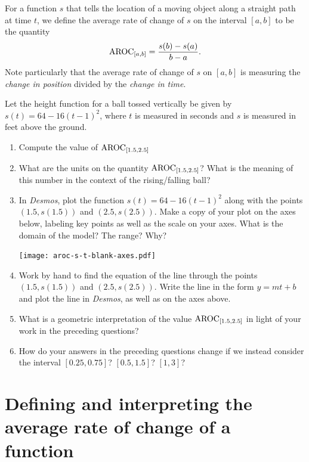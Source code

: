 \documentclass[nooutcomes]{ximera}
\begin{document}
For a function $s$ that tells the location of a moving object along a straight path at time $t$, we define the average rate of change of $s$ on the interval $[a,b]$ to be the quantity%
\begin{equation*}
\mathrm{AROC}_{[a,b]} = \frac{s(b)-s(a)}{b-a}\text{.}
\end{equation*}
 Note particularly that the average rate of change of $s$ on $[a,b]$ is measuring the \emph{change in position} divided by the \emph{change in time}.%

\begin{exploration}
Let the height function for a ball tossed vertically be given by $s(t) = 64 - 16(t-1)^2$, where $t$ is measured in seconds and $s$ is measured in feet above the ground.
\begin{enumerate}[label=\alph*.]
\item Compute the value of $\mathrm{AROC}_{[1.5,2.5]}$
\item What are the units on the quantity $\mathrm{AROC}_{[1.5,2.5]}$? What is the meaning of this number in the context of the rising/falling ball?
\item In \emph{Desmos}, plot the function $s(t) = 64 - 16(t-1)^2$ along with the points $(1.5,s(1.5))$ and $(2.5, s(2.5))$. Make a copy of your plot on the axes below, labeling key points as well as the scale on your axes. What is the domain of the model? The range? Why?
\begin{image}
\texttt{[image: aroc-s-t-blank-axes.pdf]}
\end{image}
\item Work by hand to find the equation of the line through the points $(1.5,s(1.5))$ and $(2.5, s(2.5))$. Write the line in the form $y = mt + b$ and plot the line in \emph{Desmos}, as well as on the axes above.
\item What is a geometric interpretation of the value $\mathrm{AROC}_{[1.5,2.5]}$ in light of your work in the preceding questions?
\item How do your answers in the preceding questions change if we instead consider the interval $[0.25, 0.75]$? $[0.5, 1.5]$? $[1,3]$?
\end{enumerate}
\end{exploration}



\section{Defining and interpreting the average rate of change of a function}
\end{document}
